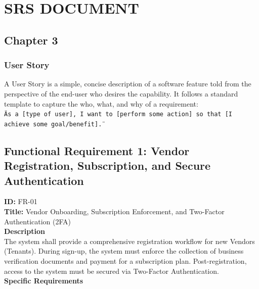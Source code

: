 \chapter{SRS DOCUMENT} \label{ch:procedure}
\section*{Chapter 3}

\subsection*{User Story}

A User Story is a simple, concise description of a software feature told from the perspective of the end-user who desires the capability. It follows a standard template to capture the who, what, and why of a requirement:\\
\texttt{\"As a [type of user], I want to [perform some action] so that [I achieve some goal/benefit].\"}

    
\section{Functional Requirement 1: Vendor Registration, Subscription, and Secure Authentication}

\textbf{ID:} FR-01 \\
\textbf{Title:} Vendor Onboarding, Subscription Enforcement, and Two-Factor Authentication (2FA)\\
\textbf{Description}\\
The system shall provide a comprehensive registration workflow for new Vendors (Tenants). During sign-up, the system must enforce the collection of business verification documents and payment for a subscription plan. Post-registration, access to the system must be secured via Two-Factor Authentication.\\
\textbf{Specific Requirements}


